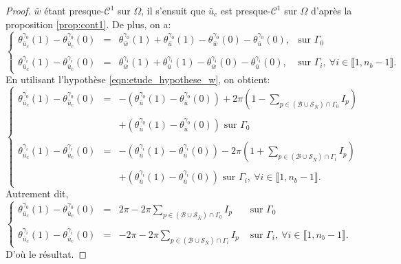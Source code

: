 \begin{proof}
$\bar{w}$ étant presque-$\mathcal{C}^1$ sur $\Omega$, il s'ensuit que $\bar{u}_c$ est presque-$\mathcal{C}^1$ sur $\Omega$ d'après la proposition \ref{prop:cont1}.
De plus, on a:
    $$
    \left\{
    \begin{array}{lcll}
    \theta_{\bar{u}_c}^{\gamma_0}(1)-\theta_{\bar{u}_c}^{\gamma_0}(0)&=&\theta_{\bar{w}}^{\gamma_0}(1)+\theta_{\bar{u}}^{\gamma_0}(1)-\theta_{\bar{w}}^{\gamma_0}(0)-\theta_{\bar{u}}^{\gamma_0}(0),&\mbox{sur }\Gamma_0\\\\
    \theta_{\bar{u}_c}^{\gamma_i}(1)-\theta_{\bar{u}_c}^{\gamma_i}(0)&=&\theta_{\bar{w}}^{\gamma_i}(1)+\theta_{\bar{u}}^{\gamma_i}(1)-\theta_{\bar{w}}^{\gamma_i}(0)-\theta_{\bar{u}}^{\gamma_i}(0),&\mbox{sur }\Gamma_i,~\forall i\in\llbracket 1, n_b-1\rrbracket.
    \end{array}
    \right.
    $$
    En utilisant l'hypothèse \eqref{eqn:etude_hypothese_w}, on obtient:
    $$
    \left\{
    \begin{array}{lcl}
    \theta_{\bar{u}_c}^{\gamma_0}(1)-\theta_{\bar{u}_c}^{\gamma_0}(0)&=&-\left(\theta_{\bar{u}}^{\gamma_0}(1)-\theta_{\bar{u}}^{\gamma_0}(0)\right)+2\pi\left(1-\displaystyle\sum_{p\in(\mathcal{B}\cup\mathcal{S}_{\bar{N}})\cap\Gamma_0}I_p\right)\\\\
    &&+\left(\theta_{\bar{u}}^{\gamma_0}(1)-\theta_{\bar{u}}^{\gamma_0}(0)\right)\mbox{ sur }\Gamma_0\\\\
    \theta_{\bar{u}_c}^{\gamma_i}(1)-\theta_{\bar{u}_c}^{\gamma_i}(0)&=&-\left(\theta_{\bar{u}}^{\gamma_i}(1)-\theta_{\bar{u}}^{\gamma_i}(0)\right)-2\pi\left(1+\displaystyle\sum_{p\in(\mathcal{B}\cup\mathcal{S}_{\bar{N}})\cap\Gamma_i}I_p\right)\\\\
    &&+\left(\theta_{\bar{u}}^{\gamma_i}(1)-\theta_{\bar{u}}^{\gamma_i}(0)\right)\mbox{ sur }\Gamma_i,~\forall i\in\llbracket 1, n_b-1\rrbracket.
    \end{array}
    \right.
    $$
    Autrement dit,
    $$
    \left\{
    \begin{array}{lcll}
    \theta_{\bar{u}_c}^{\gamma_0}(1)-\theta_{\bar{u}_c}^{\gamma_0}(0)&=&2\pi-2\pi\displaystyle\sum_{p\in(\mathcal{B}\cup\mathcal{S}_{\bar{N}})\cap\Gamma_0}I_p&\mbox{ sur }\Gamma_0\\\\
    \theta_{\bar{u}_c}^{\gamma_i}(1)-\theta_{\bar{u}_c}^{\gamma_i}(0)&=&-2\pi-2\pi\displaystyle\sum_{p\in(\mathcal{B}\cup\mathcal{S}_{\bar{N}})\cap\Gamma_i}I_p&\mbox{ sur }\Gamma_i,~\forall i\in\llbracket 1, n_b-1\rrbracket.
    \end{array}
    \right.
    $$
    D'où le résultat.
\end{proof}

